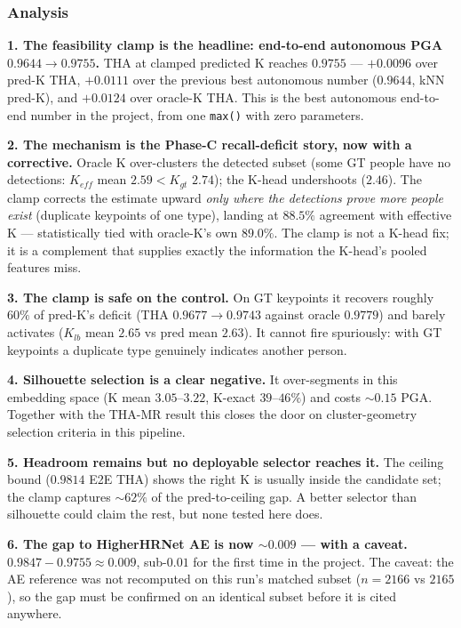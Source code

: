 \subsubsection{Analysis}

\textbf{1. The feasibility clamp is the headline: end-to-end autonomous PGA $0.9644 \rightarrow 0.9755$.} THA at clamped predicted K reaches $0.9755$ --- $+0.0096$ over pred-K THA, $+0.0111$ over the previous best autonomous number ($0.9644$, kNN pred-K), and $+0.0124$ over oracle-K THA. This is the best autonomous end-to-end number in the project, from one \texttt{max()} with zero parameters.

\textbf{2. The mechanism is the Phase-C recall-deficit story, now with a corrective.} Oracle K over-clusters the detected subset (some GT people have no detections: $K_{eff}$ mean $2.59 < K_{gt}$ $2.74$); the K-head undershoots ($2.46$). The clamp corrects the estimate upward \emph{only where the detections prove more people exist} (duplicate keypoints of one type), landing at $88.5\%$ agreement with effective K --- statistically tied with oracle-K's own $89.0\%$. The clamp is not a K-head fix; it is a complement that supplies exactly the information the K-head's pooled features miss.

\textbf{3. The clamp is safe on the control.} On GT keypoints it recovers roughly $60\%$ of pred-K's deficit (THA $0.9677 \rightarrow 0.9743$ against oracle $0.9779$) and barely activates ($K_{lb}$ mean $2.65$ vs pred mean $2.63$). It cannot fire spuriously: with GT keypoints a duplicate type genuinely indicates another person.

\textbf{4. Silhouette selection is a clear negative.} It over-segments in this embedding space (K mean $3.05$--$3.22$, K-exact $39$--$46\%$) and costs $\sim\!0.15$ PGA. Together with the THA-MR result this closes the door on cluster-geometry selection criteria in this pipeline.

\textbf{5. Headroom remains but no deployable selector reaches it.} The ceiling bound ($0.9814$ E2E THA) shows the right K is usually inside the candidate set; the clamp captures $\sim\!62\%$ of the pred-to-ceiling gap. A better selector than silhouette could claim the rest, but none tested here does.

\textbf{6. The gap to HigherHRNet AE is now $\sim\!0.009$ --- with a caveat.} $0.9847 - 0.9755 \approx 0.009$, sub-$0.01$ for the first time in the project. The caveat: the AE reference was not recomputed on this run's matched subset ($n\!=\!2166$ vs $2165$), so the gap must be confirmed on an identical subset before it is cited anywhere.


